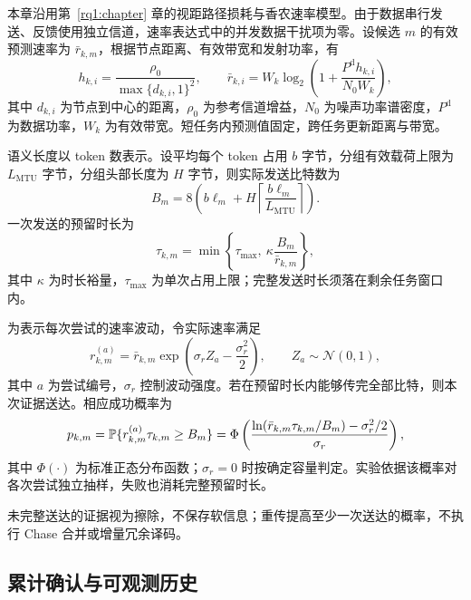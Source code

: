 本章沿用第~\ref{rq1:chapter} 章的视距路径损耗与香农速率模型。由于数据串行发送、反馈使用独立信道，速率表达式中的并发数据干扰项为零。设候选 $m$ 的有效预测速率为 $\bar r_{k,m}$，根据节点距离、有效带宽和发射功率，有
\begin{equation}
  h_{k,i}=\frac{\rho_0}{\max\{d_{k,i},1\}^2},\qquad
  \bar r_{k,i}=W_k\log_2\left(1+\frac{P^{\mathrm d}h_{k,i}}{N_0W_k}\right),
  \label{rq3:eq:rate}
\end{equation}
其中 $d_{k,i}$ 为节点到中心的距离，$\rho_0$ 为参考信道增益，$N_0$ 为噪声功率谱密度，$P^{\mathrm d}$ 为数据功率，$W_k$ 为有效带宽。短任务内预测值固定，跨任务更新距离与带宽。

语义长度以 token 数表示。设平均每个 token 占用 $b$ 字节，分组有效载荷上限为 $L_{\mathrm{MTU}}$ 字节，分组头部长度为 $H$ 字节，则实际发送比特数为
\begin{equation}
  B_m=8\left(b\ell_m+H\left\lceil\frac{b\ell_m}{L_{\mathrm{MTU}}}\right\rceil\right).
  \label{rq3:eq:bits}
\end{equation}
一次发送的预留时长为
\begin{equation}
  \tau_{k,m}=\min\left\{\tau_{\max},\ \kappa\frac{B_m}{\bar r_{k,m}}\right\},
  \label{rq3:eq:duration}
\end{equation}
其中 $\kappa$ 为时长裕量，$\tau_{\max}$ 为单次占用上限；完整发送时长须落在剩余任务窗口内。

为表示每次尝试的速率波动，令实际速率满足
\begin{equation}
  r_{k,m}^{(a)}=\bar r_{k,m}\exp\left(\sigma_r Z_a-\frac{\sigma_r^2}{2}\right),
  \qquad Z_a\sim\mathcal{N}(0,1),
  \label{rq3:eq:random-rate}
\end{equation}
其中 $a$ 为尝试编号，$\sigma_r$ 控制波动强度。若在预留时长内能够传完全部比特，则本次证据送达。相应成功概率为
\begin{equation}
  p_{k,m}=\mathbb{P}\{r_{k,m}^{(a)}\tau_{k,m}\ge B_m\}
  =\Phi\left(\frac{\ln(\bar r_{k,m}\tau_{k,m}/B_m)-\sigma_r^2/2}{\sigma_r}\right),
  \label{rq3:eq:success-probability}
\end{equation}
其中 $\Phi(\cdot)$ 为标准正态分布函数；$\sigma_r=0$ 时按确定容量判定。实验依据该概率对各次尝试独立抽样，失败也消耗完整预留时长。

未完整送达的证据视为擦除，不保存软信息；重传提高至少一次送达的概率，不执行 Chase 合并或增量冗余译码。

\subsection{累计确认与可观测历史}
\label{rq3:subsec:feedback}

